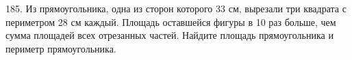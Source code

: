 185. Из прямоугольника, одна из сторон которого 33 см, вырезали три квадрата с периметром 28 см каждый. Площадь оставшейся фигуры в 10 раз больше, чем сумма площадей всех отрезанных частей. Найдите площадь прямоугольника и периметр прямоугольника.\\
